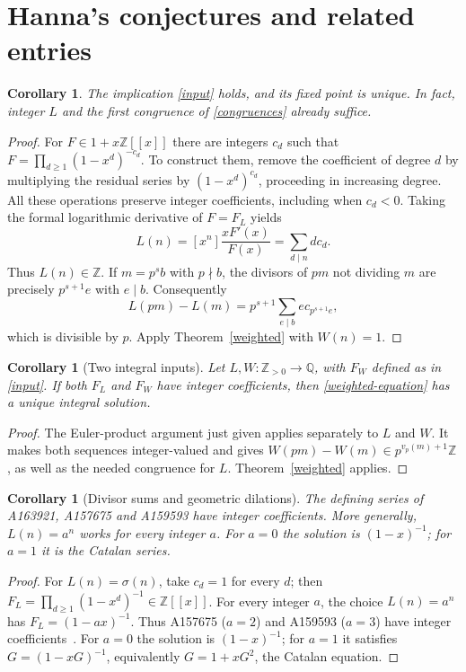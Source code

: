 \documentclass[11pt]{article}
\newtheorem{corollary}[theorem]{Corollary}
\newcommand{\Z}{\mathbb Z}
\newcommand{\Q}{\mathbb Q}
\begin{document}
\section{Hanna's conjectures and related entries}

\begin{corollary}\label{original}
The implication \eqref{input} holds, and its fixed point is unique.
In fact, integer $L$ and the first congruence of \eqref{congruences}
already suffice.
\end{corollary}
\begin{proof}
For $F\in1+x\Z[[x]]$ there are integers $c_d$ such that
$F=\prod_{d\geq1}(1-x^d)^{-c_d}$.
To construct them, remove the coefficient of degree $d$ by multiplying
the residual series by $(1-x^d)^{c_d}$, proceeding in increasing degree.
All these operations preserve integer coefficients, including when $c_d<0$.
Taking the formal logarithmic derivative of $F=F_L$ yields
\[
 L(n)=[x^n]\frac{xF'(x)}{F(x)}=\sum_{d\mid n}d c_d.
\]
Thus $L(n)\in\Z$.
If $m=p^sb$ with $p\nmid b$, the divisors of $pm$ not dividing $m$
are precisely $p^{s+1}e$ with $e\mid b$. Consequently
\[
 L(pm)-L(m)=p^{s+1}\sum_{e\mid b} e c_{p^{s+1}e},
\]
which is divisible by $p$. Apply Theorem~\ref{weighted} with $W(n)=1$.
\end{proof}

\begin{corollary}[Two integral inputs]\label{twoinputs}
Let $L,W:\Z_{>0}\to\Q$, with $F_W$ defined as in \eqref{input}.
If both $F_L$ and $F_W$ have integer coefficients,
then \eqref{weighted-equation} has a unique integral solution.
\end{corollary}
\begin{proof}
The Euler-product argument just given applies separately to $L$ and $W$.
It makes both sequences integer-valued and gives
$W(pm)-W(m)\in p^{v_p(m)+1}\Z$, as well as the needed congruence for $L$.
Theorem~\ref{weighted} applies.
\end{proof}

\begin{corollary}[Divisor sums and geometric dilations]\label{instances}
The defining series of A163921, A157675 and A159593 have integer coefficients.
More generally, $L(n)=a^n$ works for every integer $a$.
For $a=0$ the solution is $(1-x)^{-1}$; for $a=1$ it is the Catalan series.
\end{corollary}
\begin{proof}
For $L(n)=\sigma(n)$, take $c_d=1$ for every $d$; then
$F_L=\prod_{d\geq1}(1-x^d)^{-1}\in\Z[[x]]$.
For every integer $a$, the choice $L(n)=a^n$ has
$F_L=(1-ax)^{-1}$. Thus A157675 ($a=2$) and A159593 ($a=3$)
have integer coefficients~\cite{oeis157675,oeis159593}.
For $a=0$ the solution is $(1-x)^{-1}$; for $a=1$ it satisfies
$G=(1-xG)^{-1}$, equivalently $G=1+xG^2$, the Catalan equation.
\end{proof}
\end{document}
